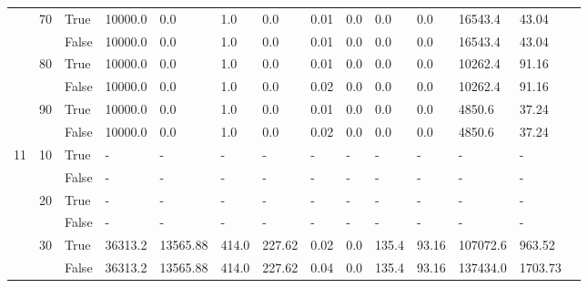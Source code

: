 \begin{landscape}
\begin{small}
\begin{longtable}[c]{@{}lll|ll|ll|ll|ll|lll@{}}
   & 70 & True  & 10000.0         & 0.0            & 1.0           & 0.0           & 0.01          & 0.0           & 0.0           & 0.0           & 16543.4       & 43.04       &  \\
   &    & False & 10000.0         & 0.0            & 1.0           & 0.0           & 0.01          & 0.0           & 0.0           & 0.0           & 16543.4       & 43.04       &  \\
   & 80 & True  & 10000.0         & 0.0            & 1.0           & 0.0           & 0.01          & 0.0           & 0.0           & 0.0           & 10262.4       & 91.16       &  \\
   &    & False & 10000.0         & 0.0            & 1.0           & 0.0           & 0.02          & 0.0           & 0.0           & 0.0           & 10262.4       & 91.16       &  \\
   & 90 & True  & 10000.0         & 0.0            & 1.0           & 0.0           & 0.01          & 0.0           & 0.0           & 0.0           & 4850.6        & 37.24       &  \\
   &    & False & 10000.0         & 0.0            & 1.0           & 0.0           & 0.02          & 0.0           & 0.0           & 0.0           & 4850.6        & 37.24       &  \\
  \midrule
11 & 10 & True  & -               & -              & -             & -             & -             & -             & -             & -             & -             & -           &  \\
   &    & False & -               & -              & -             & -             & -             & -             & -             & -             & -             & -           &  \\
   & 20 & True  & -               & -              & -             & -             & -             & -             & -             & -             & -             & -           &  \\
   &    & False & -               & -              & -             & -             & -             & -             & -             & -             & -             & -           &  \\
   & 30 & True  & 36313.2         & 13565.88       & 414.0         & 227.62        & 0.02          & 0.0           & 135.4         & 93.16         & 107072.6      & 963.52      &  \\
   &    & False & 36313.2         & 13565.88       & 414.0         & 227.62        & 0.04          & 0.0           & 135.4         & 93.16         & 137434.0      & 1703.73     &  \\

\end{longtable}
\end{small}
\end{landscape}
